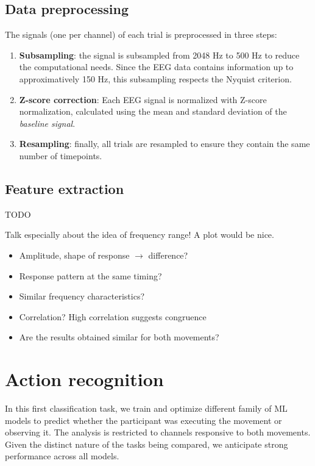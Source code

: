 \documentclass[10pt,conference,compsocconf]{IEEEtran}
\begin{document}
\subsection{Data preprocessing}
\label{subsec:preproc}
The signals (one per channel) of each trial is preprocessed in three steps:
\begin{enumerate}
  \item \textbf{Subsampling}: the signal is subsampled from 2048 Hz to 500 Hz to reduce the computational needs. Since the EEG data contains information up to approximatively 150 Hz, this subsampling respects the Nyquist criterion.
  \item \textbf{Z-score correction}: Each EEG signal is normalized with Z-score normalization, calculated using the mean and standard deviation of the \textit{baseline signal}.
  \item \textbf{Resampling}: finally, all trials are resampled to ensure they contain the same number of timepoints.
\end{enumerate}

\subsection{Feature extraction}
TODO

Talk especially about the idea of frequency range! A plot would be nice.

\begin{itemize}
    \item Amplitude, shape of response \(\to\) difference?
    \item Response pattern at the same timing?
    \item Similar frequency characteristics?
    \item Correlation? High correlation suggests congruence
    \item Are the results obtained similar for both movements?
\end{itemize}

\section{Action recognition}
\label{sec:actionrecognition}
In this first classification task, we train and optimize different family of ML models to predict whether the participant was executing the movement or observing it. The analysis is restricted to channels responsive to both movements. Given the distinct nature of the tasks being compared, we anticipate strong performance across all models.
\end{document}
